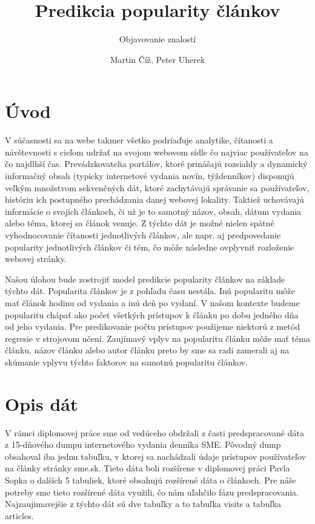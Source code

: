 \documentclass[runningheads,a4paper]{llncs}
\begin{document}
\title{Predikcia popularity článkov}
\subtitle{Objavovanie znalostí}
\author{Martin Číž, Peter Uherek}
\maketitle


\section{Úvod}
V súčasnosti sa na webe takmer všetko podriaďuje analytike, čítanosti a 
návštevnosti s cieľom udržať na svojom webovom sídle čo najviac používateľov na 
čo najdlhší čas. Prevádzkovatelia portálov, ktoré prinášajú rozsiahly a 
dynamický informačný obsah (typicky internetové vydania novín, týždenníkov) 
disponujú veľkým množstvom sekvenčných dát, ktoré zachytávajú správanie sa 
používateľov, históriu ich postupného prechádzania danej webovej lokality. 
Taktiež uchovávajú informácie o svojich článkoch, či už je to samotný názov, 
obsah, dátum vydania alebo téma, ktorej sa článok venuje. Z týchto dát je možné 
nielen spätné vyhodnocovanie čítanosti jednotlivých článkov, ale napr. aj 
predpovedanie popularity jednotlivých článkov či tém, čo môže následne ovplyvniť 
rozloženie webovej stránky. 

Našou úlohou bude zostrojiť model predikcie popularity článkov na základe týchto dát. Popularita článkov je z pohľadu času nestála. Inú popularitu môže mať článok hodinu od vydania a inú deň po vydaní. V našom kontexte budeme popularitu chápať ako počet všetkých prístupov k článku po dobu jedného dňa od jeho vydania. Pre predikovanie počtu prístupov použijeme niektorú z metód regresie v strojovom učení. Zaujímavý vplyv na popularitu článku môže mať téma článku, názov článku alebo autor článku preto by sme sa radi zamerali aj na skúmanie vplyvu týchto faktorov na samotnú popularitu článkov.

\section{Opis dát}
V rámci diplomovej práce sme od vedúceho obdržali z časti predspracované dáta z 15-dňového dumpu internetového vydania denníka SME. Pôvodný dump obsahoval iba jednu tabuľku, v ktorej sa nachádzali údaje prístupov používateľov na články stránky sme.sk. Tieto dáta boli rozšírene v diplomovej práci Pavla Sopka \cite{diplomovka} o dalších 5 tabuliek, ktoré obsahujú rozšírené dáta o článkoch. Pre náše potreby sme tieto rozšírené dáta využili, čo nám uľahčilo fázu predspracovania. Najzaujimavejšie z týchto dát sú dve tabuľky a to tabuľka visits a tabuľka articles.
\end{document}
